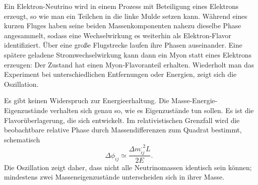 Ein Elektron-Neutrino wird in einem Prozess mit Beteiligung eines Elektrons erzeugt, so wie man ein Teilchen in die linke Mulde setzen kann. Während eines kurzen Fluges haben seine beiden Massenkomponenten nahezu dieselbe Phase angesammelt, sodass eine Wechselwirkung es weiterhin als Elektron-Flavor identifiziert. Über eine große Flugstrecke laufen ihre Phasen auseinander. Eine spätere geladene Stromwechselwirkung kann dann ein Myon statt eines Elektrons erzeugen: Der Zustand hat einen Myon-Flavoranteil erhalten. Wiederholt man das Experiment bei unterschiedlichen Entfernungen oder Energien, zeigt sich die Oszillation.

Es gibt keinen Widerspruch zur Energieerhaltung. Die Masse-Energie-Eigenzustände verhalten sich genau so, wie es Eigenzustände tun sollen. Es ist die Flavorüberlagerung, die sich entwickelt. Im relativistischen Grenzfall wird die beobachtbare relative Phase durch Massendifferenzen zum Quadrat bestimmt, schematisch
\begin{equation}
\Delta\phi_{ij}\simeq \frac{\Delta m_{ij}^{,2}L}{2E}.
\end{equation}
Die Oszillation zeigt daher, dass nicht alle Neutrinomassen identisch sein können; mindestens zwei Masseneigenzustände unterscheiden sich in ihrer Masse.

\begin{classroomqa}
\end{classroomqa}

\begin{classroomqa}
\end{classroomqa}

\begin{classroomqa}
\end{classroomqa}

